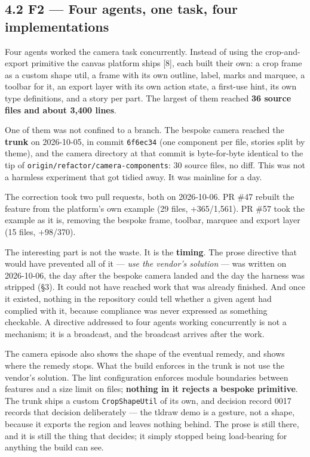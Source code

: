 \documentclass[11pt,a4paper]{article}
\begin{document}
\subsection*{4.2 F2 --- Four agents, one task, four implementations}

Four agents worked the camera task concurrently. Instead of using the crop-and- export primitive the canvas platform ships [8], each built their own: a crop frame as a custom shape util, a frame with its own outline, label, marks and marquee, a toolbar for it, an export layer with its own action state, a first-use hint, its own type definitions, and a story per part. The largest of them reached \textbf{36 source files and about 3,400 lines}.

One of them was not confined to a branch. The bespoke camera reached the \textbf{trunk} on 2026-10-05, in commit \texttt{6f6ec34} (\textquotedbl{}one component per file, stories split by theme\textquotedbl{}), and the camera directory at that commit is byte-for-byte identical to the tip of \texttt{origin/refactor/camera-components}: 30 source files, no diff. This was not a harmless experiment that got tidied away. It was mainline for a day.

The correction took two pull requests, both on 2026-10-06. PR \#47 rebuilt the feature from the platform's own example (29 files, +365/\textminus{}1,561). PR \#57 took the example as it is, removing the bespoke frame, toolbar, marquee and export layer (15 files, +98/\textminus{}370).

The interesting part is not the waste. It is the \textbf{timing}. The prose directive that would have prevented all of it --- \emph{use the vendor's solution} --- was written on 2026-10-06, the day after the bespoke camera landed and the day the harness was stripped (\S{}3). It could not have reached work that was already finished. And once it existed, nothing in the repository could tell whether a given agent had complied with it, because compliance was never expressed as something checkable. A directive addressed to four agents working concurrently is not a mechanism; it is a broadcast, and the broadcast arrives after the work.

The camera episode also shows the shape of the eventual remedy, and shows where the remedy stops. What the build enforces in the trunk is not \textquotedbl{}use the vendor's solution\textquotedbl{}. The lint configuration enforces module boundaries between features and a size limit on files; \textbf{nothing in it rejects a bespoke primitive}. The trunk ships a custom \texttt{CropShapeUtil} of its own, and decision record 0017 records that decision deliberately --- the tldraw demo is \textquotedbl{}a gesture, not a shape\textquotedbl{}, because it exports the region and leaves nothing behind. The prose is still there, and it is still the thing that decides; it simply stopped being load-bearing for anything the build can see.
\end{document}
